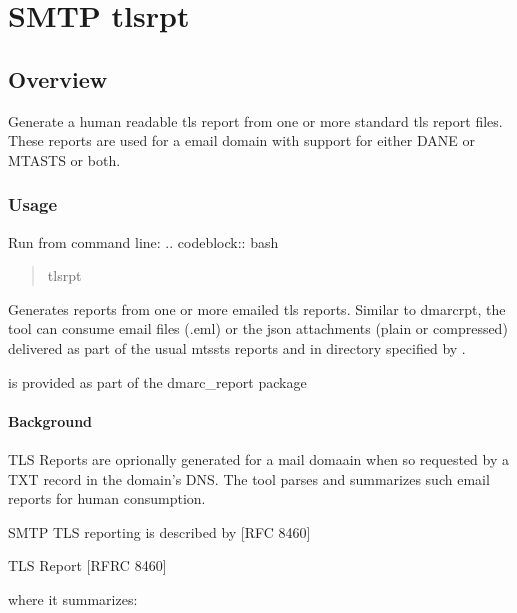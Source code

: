 \documentclass[letterpaper,10pt,english]{sphinxmanual}
\begin{document}
\chapter{SMTP tls\sphinxhyphen{}rpt}
\label{\detokenize{Readme-TLS:smtp-tls-rpt}}\label{\detokenize{Readme-TLS::doc}}

\section{Overview}
\label{\detokenize{Readme-TLS:overview}}
\sphinxAtStartPar
Generate a human readable tls report from one or more standard tls report files.
These reports are used for a email domain with support for either DANE or MTA\sphinxhyphen{}STS or both.


\subsection{Usage}
\label{\detokenize{Readme-TLS:usage}}
\sphinxAtStartPar
Run from command line:
.. code\sphinxhyphen{}block:: bash
\begin{quote}

\sphinxAtStartPar
tls\sphinxhyphen{}rpt
\end{quote}

\sphinxAtStartPar
Generates reports from one or more emailed tls reports. Similar to
dmarc\sphinxhyphen{}rpt, the tool can consume email files (.eml) or the json attachments (plain or compressed)
delivered as part of the usual mts\sphinxhyphen{}sts reports \sphinxhyphen{} and in directory specified by .

\sphinxAtStartPar
{} is provided as part of the dmarc\_report package


\subsubsection{Background}
\label{\detokenize{Readme-TLS:background}}
\sphinxAtStartPar
TLS Reports are oprionally generated for a mail domaain when so requested by a TXT record in
the domain’s DNS. The tool parses and summarizes such email reports for human consumption.

\sphinxAtStartPar
SMTP TLS reporting is described by {[}RFC 8460{]} %
\begin{footnote}[1]\sphinxAtStartFootnote
TLS Report {[}RFRC 8460{]} 
%
\end{footnote} where it summarizes:
\end{document}
